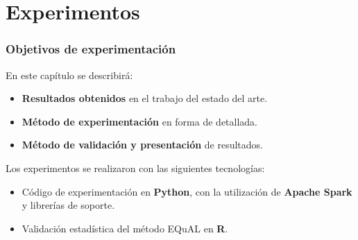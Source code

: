 \section{Experimentos}


\begin{frame}
	\frametitle{Objetivos de experimentación}
	En este capítulo se describirá:
	\begin{itemize}[<*>]
		\item \textbf{Resultados obtenidos} en el trabajo del estado del arte.
		\item \textbf{Método de experimentación} en forma de detallada.
		\item \textbf{Método de validación y presentación} de resultados.
	\end{itemize}

	\bigskip

	Los experimentos se realizaron con las siguientes tecnologías:
	\begin{itemize}[<*>]
		\item Código de experimentación en \textbf{Python}, con la utilización de \textbf{Apache Spark} y librerías de soporte.
		\item Validación estadística del método EQuAL en \textbf{R}.
	\end{itemize}
\end{frame}

